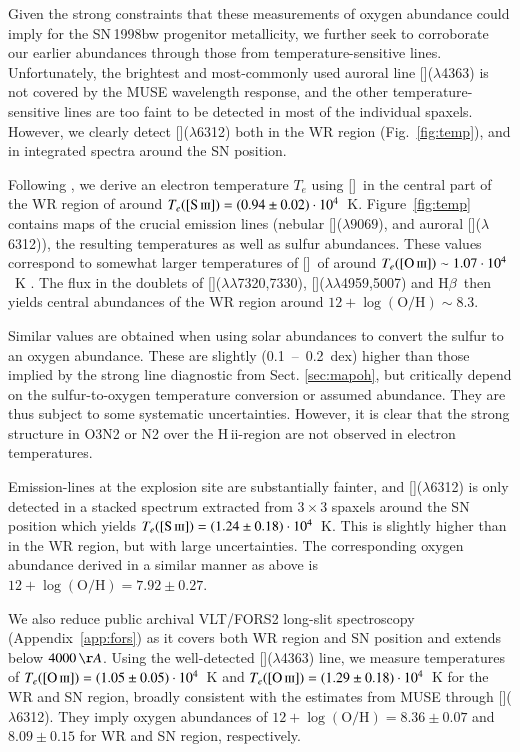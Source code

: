 \documentclass[traditabstract, referee]{aa}
\newcommand{\hb}{H$\beta$}
\newcommand{\hii}{\mbox{H\,{\sc ii}}}
\newcommand{\oh}{12+\log(\mathrm{O/H})}
\newcommand{\siii}{[\ion{S}{iii}]}
\newcommand{\oii}{[\ion{O}{ii}]}
\newcommand{\oiii}{[\ion{O}{iii}]}
\begin{document}
Given the strong constraints that these measurements of oxygen abundance could imply for the SN\,1998bw progenitor metallicity, we further seek to corroborate our earlier abundances through those from temperature-sensitive lines. Unfortunately, the brightest and most-commonly used auroral line \oiii($\lambda$4363) is not covered by the MUSE wavelength response, and the other temperature-sensitive lines are too faint to be detected in most of the individual spaxels. However, we clearly detect \siii($\lambda$6312) both in the WR region (Fig.~\ref{fig:temp}), and in integrated spectra around the SN position.

Following \citet{2013ApJS..207...21N}, we derive an electron temperature $T_e$ using \siii\, in the central part of the WR region of around $T_e({\siii})=(0.94\pm0.02)\cdot10^{4}$~K. Figure~\ref{fig:temp} contains maps of the crucial emission lines (nebular \siii($\lambda9069$), and auroral \siii($\lambda$6312)), the resulting temperatures as well as sulfur abundances. These values correspond to somewhat larger temperatures of \oiii~of around $T_e(\oiii) \sim 1.07\cdot10^{4}$~K \citep{2006A&A...448..955I, 2012A&A...547A..29B}. The flux in the doublets of \oii($\lambda\lambda$7320,7330), \oiii($\lambda\lambda$4959,5007) and \hb\, then yields central abundances of the WR region around $\oh \sim 8.3$.

Similar values are obtained when using solar abundances to convert the sulfur to an oxygen abundance. These are slightly (0.1~--~0.2~dex) higher than those implied by the strong line diagnostic from Sect. \ref{sec:mapoh}, but critically depend on the sulfur-to-oxygen temperature conversion or assumed abundance. They are thus subject to some systematic uncertainties. However, it is clear that the strong structure in O3N2 or N2 over the \hii-region are not observed in electron temperatures.

Emission-lines at the explosion site are substantially fainter, and \siii($\lambda$6312) is only detected in a stacked spectrum extracted from $3\times3$ spaxels around the SN position which yields $T_{e}(\siii)=(1.24\pm0.18)\cdot10^{4}$~K. This is slightly higher than in the WR region, but with large uncertainties. The corresponding oxygen abundance derived in a similar manner as above is $\oh=7.92\pm0.27$.

We also reduce public archival VLT/FORS2 long-slit spectroscopy (Appendix~\ref{app:fors}) as it covers both WR region and SN position and extends below $4000\,\AA$. Using the well-detected \oiii($\lambda$4363) line, we measure temperatures of $T_{e}(\oiii)=(1.05\pm0.05)\cdot 10^{4}$~K and $T_{e}(\oiii)=(1.29\pm0.18)\cdot10^{4}$~K for the WR and SN region, broadly consistent with the estimates from MUSE through \siii($\lambda$6312). They imply oxygen abundances of $\oh=8.36\pm0.07$ and $8.09\pm0.15$ for WR and SN region, respectively.
\end{document}
